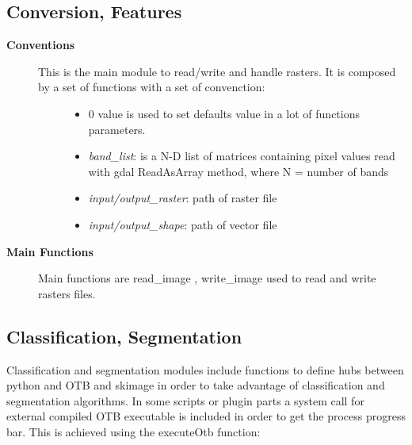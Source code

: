 \documentclass[letterpaper,10pt,english]{sphinxmanual}
\begin{document}
\subsection{Conversion, Features}
\label{lib:conversion-features}\begin{description}
\item[{\textbf{Conventions}}] \leavevmode\begin{description}
\item[{This is the main module to read/write and handle rasters. It is composed by a set of functions with a set of convenction:}] \leavevmode\begin{itemize}
\item {} 
0 value is used to set defaults value in a lot of functions parameters.

\item {} 
\emph{band\_list}: is a N-D list of matrices containing pixel values read with gdal ReadAsArray method, where N = number of bands

\item {} 
\emph{input/output\_raster}: path of raster file

\item {} 
\emph{input/output\_shape}: path of vector file

\end{itemize}

\end{description}

\item[{\textbf{Main Functions}}] \leavevmode
Main functions are read\_image , write\_image used to read and write rasters files.

\end{description}


\subsection{Classification, Segmentation}
\label{lib:classification-segmentation}
Classification and segmentation modules include functions to define hubs between python and OTB and skimage in order to take advantage of classification and segmentation algorithms. In some scripts or plugin parts a system call for external compiled OTB executable is included in order to get the process progress bar. This is achieved using the executeOtb function:
\end{document}

